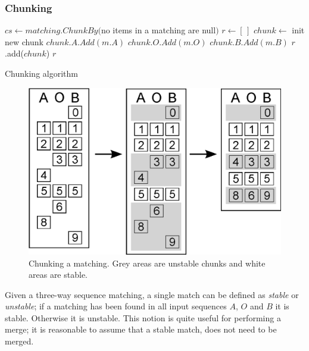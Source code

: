 \documentclass[11pt]{article}
\begin{document}
\subsubsection{Chunking}

\begin{algorithm}
\begin{algorithmic}
	\State $cs \gets matching.ChunkBy($no items in a matching are null$)$
	\State $r \gets [\,]$
		\State $chunk \gets $ init new chunk
				\State $chunk.A.Add(m.A)$
			\EndIf
				\State $chunk.O.Add(m.O)$
			\EndIf
				\State $chunk.B.Add(m.B)$
			\EndIf
		\EndFor
		\State $r$.add($chunk$)
	\EndFor
	\State \Return $r$
\EndFunction
\end{algorithmic}
\caption{Chunking algorithm}
  \label{CunkingAlgorithm}
\end{algorithm}

\begin{figure}
   \centerline{\includegraphics[scale=0.4]{drawings/eps/threewaymatching-chunking.eps}}
   \caption{Chunking a matching. Grey areas are unstable chunks and white areas are stable.}
   \label{Chunking}
\end{figure}

Given a three-way sequence matching, a single match can be defined as \textit{stable} or \textit{unstable}; if a matching has been found in all input sequences $A$, $O$ and $B$ it is stable. Otherwise it is unstable. This notion is quite useful for performing a merge; it is reasonable to assume that a stable match, does not need to be merged.
\end{document}
